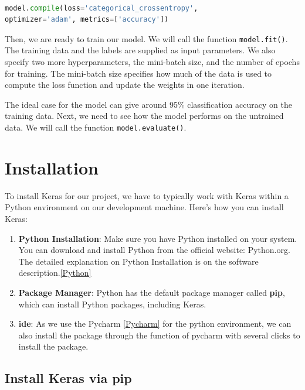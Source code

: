\begin{lstlisting}[language=Python]
	
model.compile(loss='categorical_crossentropy',
optimizer='adam', metrics=['accuracy'])
\end{lstlisting}


Then, we are ready to train our model. We will call the function \texttt{model.fit()}. The training data and the labels are supplied as input parameters. We also specify two more hyperparameters, the mini-batch size, and the number of epochs for training. The mini-batch size specifies how much of the data is used to compute the loss function and update the weights in one iteration.

The ideal case for the model can give around 95\% classification accuracy on the training data. Next, we need to see how the model performs on the untrained data. We will call the function \texttt{model.evaluate()}. 

\section{Installation}
	
To install Keras for our project, we have to typically work with Keras within a Python environment on our development machine. Here's how you can install Keras:

\begin{enumerate}
	\item \textbf{Python Installation}: Make sure you have Python installed on your system. You can download and install Python from the official website: Python.org. The detailed explanation on Python Installation is on the software description.\ref{Python}
	
	\item \textbf{Package Manager}: Python has the default package manager called \textbf{pip}, which can install Python packages, including Keras. 
	
	\item \textbf{\ac{ide}}: As we use the Pycharm \ref{Pycharm} for the python environment, we can also install the package through the function of pycharm with several clicks to install the package. 

	
\end{enumerate}

\subsection{Install Keras via pip}

